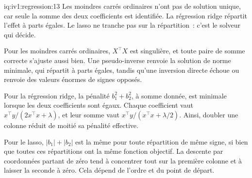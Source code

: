 \begin{solution}{iq:iv1:regression:13}
Les moindres carrés ordinaires n'ont pas de solution unique, car seule la somme des deux coefficients est identifiée. La régression ridge répartit l'effet à parts égales. Le lasso ne tranche pas sur la répartition~: c'est le solveur qui décide.

Pour les moindres carrés ordinaires, $X^\top X$ est singulière, et toute paire de somme correcte s'ajuste aussi bien. Une pseudo-inverse renvoie la solution de norme minimale, qui répartit à parts égales, tandis qu'une inversion directe échoue ou renvoie des valeurs énormes de signes opposés.

Pour la régression ridge, la pénalité $b_1^2 + b_2^2$, à somme donnée, est minimale lorsque les deux coefficients sont égaux. Chaque coefficient vaut $x^\top y/(2x^\top x + \lambda)$, et leur somme vaut $x^\top y/(x^\top x + \lambda/2)$. Ainsi, doubler une colonne réduit de moitié sa pénalité effective.

Pour le lasso, $|b_1| + |b_2|$ est la même pour toute répartition de même signe, si bien que toutes ces répartitions ont la même fonction objectif. La descente par coordonnées partant de zéro tend à concentrer tout sur la première colonne et à laisser la seconde à zéro. Cela dépend de l'ordre et du point de départ.

\end{solution}

